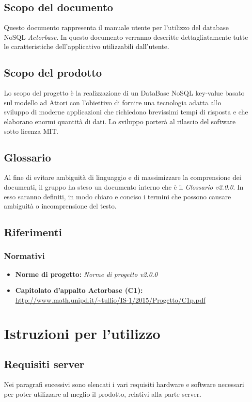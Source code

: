 \documentclass[a4paper]{article}
\begin{document}
	\subsection{Scopo del documento}
		Questo documento rappresenta il manuale utente per l'utilizzo del database NoSQL \emph{Actorbase}. In questo documento verranno descritte dettagliatamente tutte le caratteristiche dell’applicativo utilizzabili dall’utente.
	\subsection{Scopo del prodotto}
		Lo scopo del progetto è la realizzazione di un DataBase NoSQL key-value basato sul modello ad 
		Attori con l'obiettivo di fornire una tecnologia adatta allo sviluppo di moderne 
		applicazioni che richiedono brevissimi tempi di risposta e che elaborano enormi quantità 
		di dati. Lo sviluppo porterà al rilascio del software sotto licenza MIT.
	\subsection{Glossario}
		Al fine di evitare ambiguità di linguaggio e di massimizzare la comprensione dei documenti, il 
      gruppo ha steso un documento interno che è il \emph{Glossario v2.0.0}. In esso saranno definiti, in modo
      chiaro e conciso i termini che possono causare ambiguità o incomprensione del testo.
	\subsection{Riferimenti}
	\subsubsection{Normativi}
		\begin{itemize}
			\item \textbf{Norme di progetto:} \emph{Norme di progetto v2.0.0}
			\item \textbf{Capitolato d'appalto Actorbase (C1):} \\ 
			\url{http://www.math.unipd.it/~tullio/IS-1/2015/Progetto/C1p.pdf}
		\end{itemize}
	
	\newpage
	\section{Istruzioni per l'utilizzo}		
		\subsection{Requisiti server}
			Nei paragrafi sucessivi sono elencati i vari requisiti hardware e software necessari per poter utilizzare al meglio il prodotto, relativi alla parte server.
\end{document}
